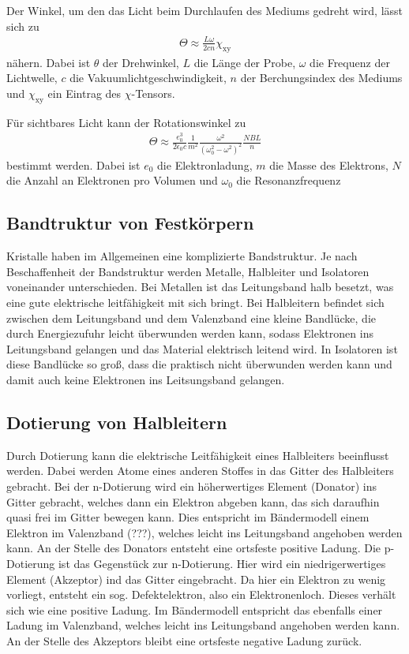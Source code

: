 Der Winkel, um den das Licht beim Durchlaufen des Mediums gedreht wird, lässt sich zu
\begin{align}
  \Theta \approx \frac{L \omega}{2 c n}\chi_{\mathrm{xy}}
  \label{eqn:theta1}
\end{align}
nähern. Dabei ist $\theta$ der Drehwinkel, $L$ die Länge der Probe, $\omega$ die Frequenz
der Lichtwelle, $c$ die Vakuumlichtgeschwindigkeit, $n$ der Berchungsindex des Mediums
und $\chi_{\mathrm{xy}}$ ein Eintrag des $\chi$-Tensors.

Für sichtbares Licht kann der Rotationswinkel zu
\begin{align}
  \Theta \approx \frac{e^3_0}{2 \epsilon_0 c} \frac{1}{m^2}\frac{\omega^2}{(\omega^2_0 - \omega^2)^2} \frac{NBL}{n}
  \label{eqn:theta2}
\end{align}
bestimmt werden. Dabei ist $e_0$ die Elektronladung, $m$ die Masse des Elektrons, $N$
die Anzahl an Elektronen pro Volumen und $\omega_0$ die Resonanzfrequenz


\subsection{Bandtruktur von Festkörpern}
\label{subsec:bandstruktur}

Kristalle haben im Allgemeinen eine komplizierte Bandstruktur. Je nach Beschaffenheit
der Bandstruktur werden Metalle, Halbleiter und Isolatoren voneinander unterschieden.
Bei Metallen ist das Leitungsband halb besetzt, was eine gute elektrische leitfähigkeit
mit sich bringt. Bei Halbleitern befindet sich zwischen dem Leitungsband und dem
Valenzband eine kleine Bandlücke, die durch Energiezufuhr leicht überwunden
werden kann, sodass Elektronen ins Leitungsband gelangen und das Material elektrisch
leitend wird. In Isolatoren ist diese Bandlücke so groß, dass die praktisch nicht
überwunden werden kann und damit auch keine Elektronen ins Leitsungsband gelangen.


\subsection{Dotierung von Halbleitern}
\label{subsec:dotierung}
Durch Dotierung kann die elektrische Leitfähigkeit eines Halbleiters beeinflusst werden.
Dabei werden Atome eines anderen Stoffes in das Gitter des Halbleiters gebracht.
Bei der n-Dotierung wird ein höherwertiges Element (Donator) ins Gitter gebracht, welches
dann ein Elektron abgeben kann, das sich daraufhin quasi frei im Gitter bewegen kann.
Dies entspricht im Bändermodell einem Elektron im Valenzband (???), welches leicht
ins Leitungsband angehoben werden kann. An der Stelle
des Donators entsteht eine ortsfeste positive Ladung.
Die p-Dotierung ist das Gegenstück zur n-Dotierung. Hier wird ein niedrigerwertiges
Element (Akzeptor) ind das Gitter eingebracht. Da hier ein Elektron zu wenig vorliegt,
entsteht ein sog. Defektelektron, also ein Elektronenloch. Dieses verhält sich
wie eine positive Ladung. Im Bändermodell entspricht das ebenfalls einer Ladung
im Valenzband, welches leicht ins Leitungsband angehoben werden kann. An der Stelle
des Akzeptors bleibt eine ortsfeste negative Ladung zurück.

